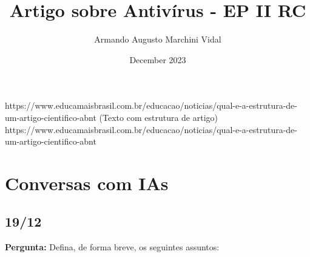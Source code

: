 \documentclass[10pt,conference,twocolumn]{article}
\title{Artigo sobre Antivírus - EP II RC}
\author{Armando Augusto Marchini Vidal}
\date{December 2023}
\begin{document}
https://www.educamaisbrasil.com.br/educacao/noticias/qual-e-a-estrutura-de-um-artigo-cientifico-abnt (Texto com estrutura de artigo)\newline
https://www.educamaisbrasil.com.br/educacao/noticias/qual-e-a-estrutura-de-um-artigo-cientifico-abnt
\newpage
\maketitle

\section{Conversas com IAs}
\subsection{19/12}
\textbf{Pergunta:}\newline
Defina, de forma breve, os seguintes assuntos:
\end{document}
